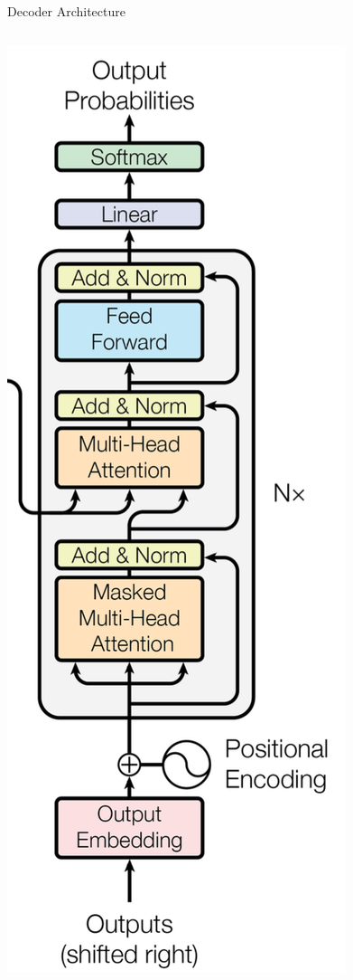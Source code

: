 \documentclass{beamer}
\begin{document}
\begin{frame}{Decoder Architecture}

\begin{columns}
  \includegraphics[width=1\linewidth]{f6.png} %


\end{columns}
\end{frame}
\end{document}
